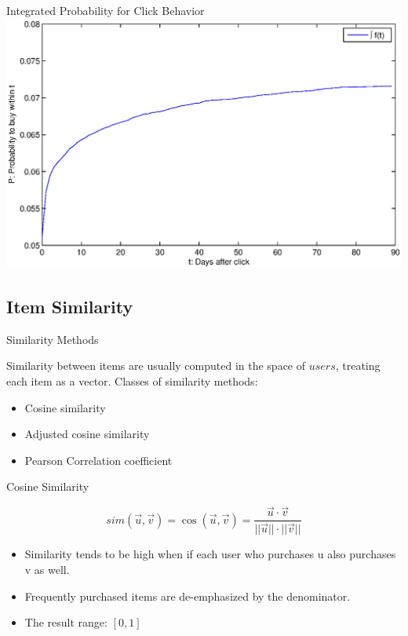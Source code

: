 \documentclass{beamer}
\begin{document}
\begin{frame}{Integrated Probability for Click Behavior}
\includegraphics[width=\linewidth]{./click_curve.eps}
\end{frame}

\subsection{Item Similarity}

\begin{frame}{Similarity Methods}

Similarity between items are usually computed in the space of $users$, treating each item as a vector. Classes of similarity methods:

\begin{itemize}
\item Cosine similarity
\item Adjusted cosine similarity
\item Pearson Correlation coefficient
\end{itemize}

\end{frame}


\begin{frame}{Cosine Similarity}

\begin{equation}
sim(\vec{u},\vec{v}) = \cos(\vec{u},\vec{v}) = \frac{\vec{u}\cdot \vec{v}}{||\vec{u}|| \cdot ||\vec{v}||}
\end{equation}

\begin{itemize}
\item Similarity tends to be high when if each user who purchases u also purchases v as well.
\item Frequently purchased items are de-emphasized by the denominator.
\item The result range: $[0,1]$
\end{itemize}


\end{frame}
\end{document}
